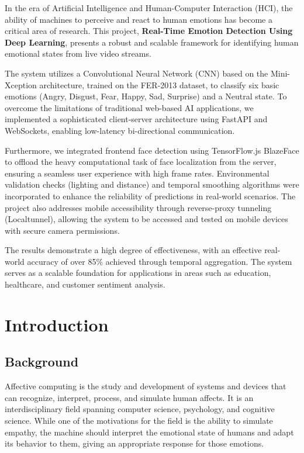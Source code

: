 \documentclass[12pt,a4paper]{report}
\begin{document}
In the era of Artificial Intelligence and Human-Computer Interaction (HCI), the ability of machines to perceive and react to human emotions has become a critical area of research. This project, \textbf{Real-Time Emotion Detection Using Deep Learning}, presents a robust and scalable framework for identifying human emotional states from live video streams.

The system utilizes a Convolutional Neural Network (CNN) based on the Mini-Xception architecture, trained on the FER-2013 dataset, to classify six basic emotions (Angry, Disgust, Fear, Happy, Sad, Surprise) and a Neutral state. To overcome the limitations of traditional web-based AI applications, we implemented a sophisticated client-server architecture using FastAPI and WebSockets, enabling low-latency bi-directional communication.

Furthermore, we integrated frontend face detection using TensorFlow.js BlazeFace to offload the heavy computational task of face localization from the server, ensuring a seamless user experience with high frame rates. Environmental validation checks (lighting and distance) and temporal smoothing algorithms were incorporated to enhance the reliability of predictions in real-world scenarios. The project also addresses mobile accessibility through reverse-proxy tunneling (Localtunnel), allowing the system to be accessed and tested on mobile devices with secure camera permissions.

The results demonstrate a high degree of effectiveness, with an effective real-world accuracy of over 85\% achieved through temporal aggregation. The system serves as a scalable foundation for applications in areas such as education, healthcare, and customer sentiment analysis.

\clearpage

\tableofcontents
\clearpage

\listoffigures
\listoftables
\clearpage

\setcounter{page}{1}

\chapter{Introduction}

\section{Background}
Affective computing is the study and development of systems and devices that can recognize, interpret, process, and simulate human affects. It is an interdisciplinary field spanning computer science, psychology, and cognitive science. While one of the motivations for the field is the ability to simulate empathy, the machine should interpret the emotional state of humans and adapt its behavior to them, giving an appropriate response for those emotions.
\end{document}

